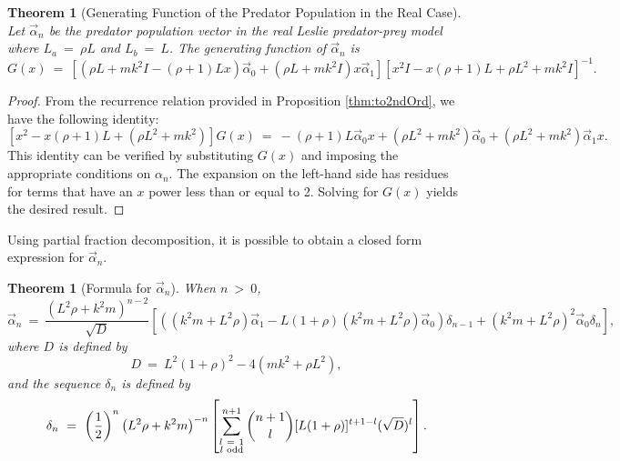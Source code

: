 \documentclass[11pt,reqno]{amsart}
\numberwithin{equation}{section}
\theoremstyle{plain}
\newtheorem{theorem}[thm]{Theorem}
\begin{document}
\begin{theorem} [Generating Function of the Predator Population in the Real Case]
    Let $\vec \alpha_n$ be the predator population vector in the real Leslie predator-prey model where 
    $L_a \ = \ \rho L$ and $L_b \ = \ L$. 
    The generating function of $\vec \alpha_n$ is
    \begin{equation}\label{eqn:genFunc}
        G(x) \ = \ 
\left[\left(\rho L + m k^2 I - (\rho + 1) L x\right)\vec \alpha_0 + (\rho L + m k^2 I) x \vec  \alpha_1\right]\left[x^2 I - x(\rho + 1) L + \rho L^2 + m k^2 I\right]^{-1}.
    \end{equation}
\end{theorem}

\begin{proof}
    From the recurrence relation provided in Proposition \ref{thm:to2ndOrd}, 
    we have the following identity: 
    \begin{equation}
        \left[x^2 - x (\rho + 1) L + (\rho L^2 + mk^2)\right]G(x) \ = \ 
        -(\rho + 1) L \vec \alpha_0 x 
        +(\rho L^2 + mk^2) \vec \alpha_0 
        + (\rho L^2  + m k^2) \vec \alpha_1 x.
    \end{equation}
    This identity can be verified by substituting $G(x)$ and imposing the appropriate conditions on $\alpha_n$. The expansion on the left-hand side has residues for terms that have an $x$ power less than or equal to 2. Solving for $G(x)$ yields the desired result. 
\end{proof}


Using partial fraction decomposition, it is possible to obtain a closed form expression for $\vec \alpha_n$.

\begin{theorem} [Formula for $\vec \alpha_n$]
    When $n \ > \  0$, 
    \begin{equation}
    \vec \alpha_n \ = \ 
    \frac {
(L^2 \rho + k^2 m)^{n - 2}
    } {\sqrt D} 
    \left[
        \left(
            (k^2m + L^2 \rho) \vec \alpha_1 - L(1 + \rho) 
\left(
            k^2m + L^2\rho
        \right)
            \vec \alpha_0
        \right)\delta_{n - 1}
        + \left(
            k^2m + L^2\rho
        \right)^2\vec \alpha_0 \delta_{n}
    \right],
    \end{equation}
    where $D$ is defined by
    \begin{equation}
        D \ = \ L ^2 (1 + \rho)^2 - 4 (mk^2 + \rho L^2),
    \end{equation}
    and the sequence $\delta_n$ is defined by 
    \begin{equation}
        \delta_n \ = \ 
        \left(
            \frac 1 2
        \right)^n 
        \left(
                L^2 \rho + k^2 m
        \right)^{-n}
        \left[
            \sum_{\substack{l \ = \  1 \\ l \textnormal{ odd}}}^{n + 1}
            \binom{n + 1}{l} 
            [L(1+\rho)]^{t + 1 - l}(\sqrt D)^l
        \right].
    \end{equation}
\end{theorem}
\end{document}
